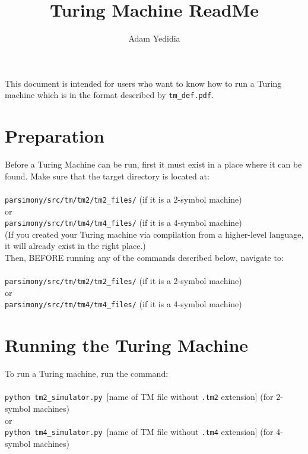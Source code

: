 \documentclass[11pt]{article}
\title{Turing Machine ReadMe}
\author{Adam Yedidia}
\begin{document}
    
\maketitle

This document is intended for users who want to know how to run a Turing machine which is in the format described by \texttt{tm_def.pdf}.

\section{Preparation}

Before a Turing Machine can be run, first it must exist in a place where it can be found. Make sure that the target directory is located at: \\ \\
\texttt{parsimony/src/tm/tm2/tm2_files/} (if it is a 2-symbol machine) \\
or \\
\texttt{parsimony/src/tm/tm4/tm4_files/} (if it is a 4-symbol machine) \\ 

(If you created your Turing machine via compilation from a higher-level language, it will already exist in the right place.) \\

Then, BEFORE running any of the commands described below, navigate to: \\ \\
\texttt{parsimony/src/tm/tm2/tm2_files/} (if it is a 2-symbol machine) \\
or \\
\texttt{parsimony/src/tm/tm4/tm4_files/} (if it is a 4-symbol machine) 

\section{Running the Turing Machine}

To run a Turing machine, run the command: \\ \\ 
\texttt{python tm2_simulator.py }[name of TM file without \texttt{.tm2} extension] (for 2-symbol machines)\\
or \\
\texttt{python tm4_simulator.py }[name of TM file without \texttt{.tm4} extension] (for 4-symbol machines)\\
\end{document}
